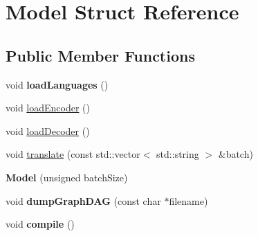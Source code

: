 \hypertarget{struct_model}{}\section{Model Struct Reference}
\label{struct_model}
\subsection*{Public Member Functions}
\begin{DoxyCompactItemize}
\item 
\mbox{\label{struct_model_a25fcfd54ff414539415c5a9e05d2d697}} 
void {\bfseries load\+Languages} ()
\item 
void \hyperlink{struct_model_aefa237830b190008efb400d88b3c8e6a}{load\+Encoder} ()
\item 
void \hyperlink{struct_model_aa2ab414d8bdb1eb04067342884e2233d}{load\+Decoder} ()
\item 
void \hyperlink{struct_model_ae148ec2146ad1d9b129809304136b6f0}{translate} (const std\+::vector$<$ std\+::string $>$ \&batch)
\item 
\mbox{\label{struct_model_a3d39bb86d8723ad8138593f323fc19e8}} 
{\bfseries Model} (unsigned batch\+Size)
\item 
\mbox{\label{struct_model_af486f304bb0edb06537b024c0d8de1bd}} 
void {\bfseries dump\+Graph\+D\+AG} (const char $\ast$filename)
\item 
\mbox{\label{struct_model_a4c9efed3fbfb8052f980402ce21794bb}} 
void {\bfseries compile} ()
\end{DoxyCompactItemize}

